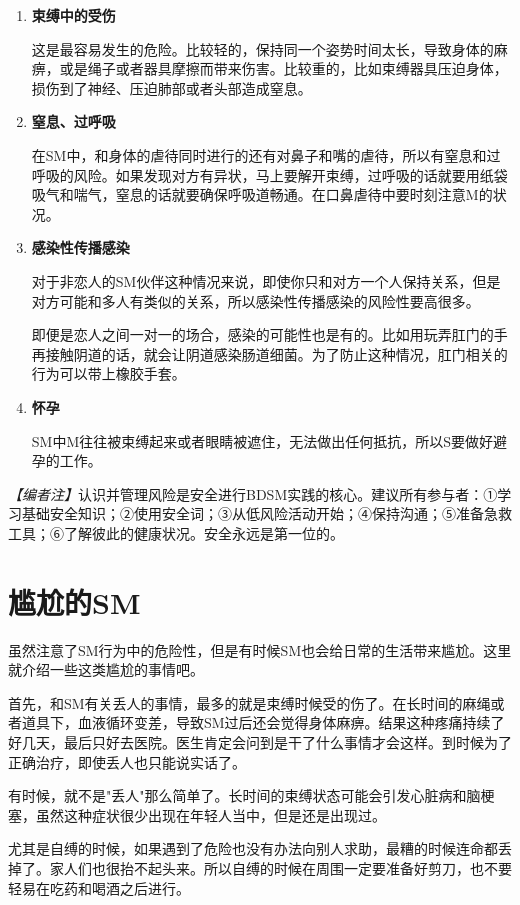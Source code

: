 \documentclass[12pt,UTF8]{ctexbook}
\begin{document}
\begin{enumerate}
	\item \textbf{束缚中的受伤}

	这是最容易发生的危险。比较轻的，保持同一个姿势时间太长，导致身体的麻痹，或是绳子或者器具摩擦而带来伤害。比较重的，比如束缚器具压迫身体，损伤到了神经、压迫肺部或者头部造成窒息。

	\item \textbf{窒息、过呼吸}

	在SM中，和身体的虐待同时进行的还有对鼻子和嘴的虐待，所以有窒息和过呼吸的风险。如果发现对方有异状，马上要解开束缚，过呼吸的话就要用纸袋吸气和喘气，窒息的话就要确保呼吸道畅通。在口鼻虐待中要时刻注意M的状况。

	\item \textbf{感染性传播感染}

	对于非恋人的SM伙伴这种情况来说，即使你只和对方一个人保持关系，但是对方可能和多人有类似的关系，所以感染性传播感染的风险性要高很多。

	即便是恋人之间一对一的场合，感染的可能性也是有的。比如用玩弄肛门的手再接触阴道的话，就会让阴道感染肠道细菌。为了防止这种情况，肛门相关的行为可以带上橡胶手套。

	\item \textbf{怀孕}

	SM中M往往被束缚起来或者眼睛被遮住，无法做出任何抵抗，所以S要做好避孕的工作。
\end{enumerate}

\textit{【编者注】}认识并管理风险是安全进行BDSM实践的核心。建议所有参与者：①学习基础安全知识；②使用安全词；③从低风险活动开始；④保持沟通；⑤准备急救工具；⑥了解彼此的健康状况。安全永远是第一位的。

\section{尴尬的SM}

虽然注意了SM行为中的危险性，但是有时候SM也会给日常的生活带来尴尬。这里就介绍一些这类尴尬的事情吧。

首先，和SM有关丢人的事情，最多的就是束缚时候受的伤了。在长时间的麻绳或者道具下，血液循环变差，导致SM过后还会觉得身体麻痹。结果这种疼痛持续了好几天，最后只好去医院。医生肯定会问到是干了什么事情才会这样。到时候为了正确治疗，即使丢人也只能说实话了。

有时候，就不是"丢人"那么简单了。长时间的束缚状态可能会引发心脏病和脑梗塞，虽然这种症状很少出现在年轻人当中，但是还是出现过。

尤其是自缚的时候，如果遇到了危险也没有办法向别人求助，最糟的时候连命都丢掉了。家人们也很抬不起头来。所以自缚的时候在周围一定要准备好剪刀，也不要轻易在吃药和喝酒之后进行。
\end{document}

